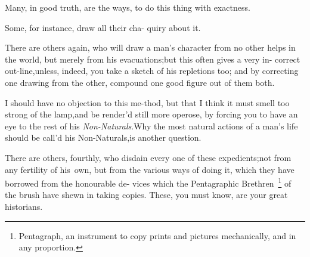 \documentclass[twoside]{article}
\begin{document}
Many, in good truth, are the ways, 
to do this thing with exactness.

Some, for instance, draw all their cha-
quiry about it.

There are others again, who will draw a man’s character
from no other helps in the world, but merely from his
evacuations;\tsk but this often gives a very in-
correct out-line,\tsk unless, indeed, you\break
take a sketch of his repletions too; and\break
by correcting one drawing from the\break
other, compound one good figure out of\break
them both.

I should have no objection to this me-\break thod, but that I think it
must smell too strong of the lamp,\tsk and be render’d
still more operose, by forcing you to have an eye to the rest of
his \textit{Non-Naturals}.\tsk\break Why the most natural actions of a
man’s life should be call’d his Non-Naturals,\tsk\break is
another question.

There are others, fourthly, who disdain every one of these expedients;\tsk not from
any fertility of his\sic\ own, but from the various ways of doing it, which they have
borrowed from the honourable de-
vices which the Pentagraphic
Brethren~\footnote{\enspace Pentagraph, \vrule width 0pt height 18pt
an instrument to copy prints and pictures
mechanically, and in any proportion.} of the brush have shewn in
taking co\-pies.\tsk 
These, you must know, are your great historians.

\noindent
{}
\end{document}
